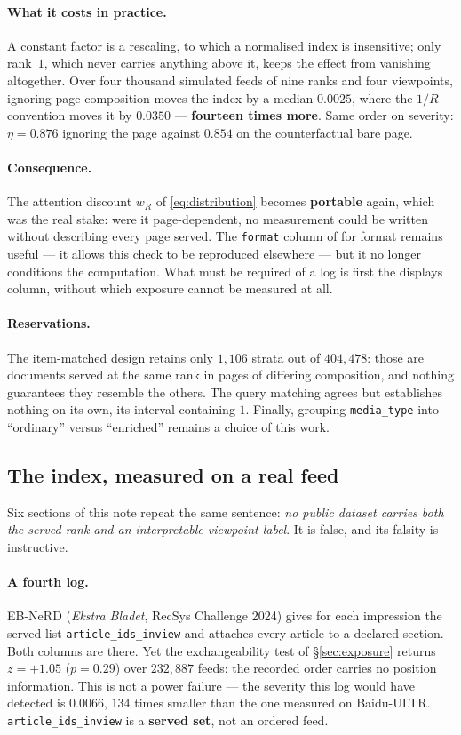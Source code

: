 \documentclass[11pt,a4paper]{article}
\begin{document}
\paragraph{What it costs in practice.} A constant factor is a rescaling, to which a normalised
index is insensitive; only rank~$1$, which never carries anything above it, keeps the effect from
vanishing altogether. Over four thousand simulated feeds of nine ranks and four viewpoints,
ignoring page composition moves the index by a median $0.0025$, where the $1/R$ convention moves
it by $0.0350$ --- \textbf{fourteen times more}. Same order on severity: $\eta = 0.876$ ignoring
the page against $0.854$ on the counterfactual bare page.

\paragraph{Consequence.} The attention discount $w_R$ of \eqref{eq:distribution} becomes
\textbf{portable} again, which was the real stake: were it page-dependent, no measurement
could be written without describing every page served. The \texttt{format} column of
for format remains useful --- it allows this check to be reproduced elsewhere --- but
it no longer conditions the computation. What must be required of a log is first the displays
column, without which exposure cannot be measured at all.

\paragraph{Reservations.} The item-matched design retains only $1{,}106$ strata out of
$404{,}478$: those are documents served at the same rank in pages of differing composition, and
nothing guarantees they resemble the others. The query matching agrees but establishes nothing on
its own, its interval containing $1$. Finally, grouping \texttt{media\_type} into ``ordinary''
versus ``enriched'' remains a choice of this work.

\subsection{The index, measured on a real feed}
\label{sec:indexmeasured}

Six sections of this note repeat the same sentence: \emph{no public dataset carries both the
served rank and an interpretable viewpoint label}. It is false, and its falsity is instructive.

\paragraph{A fourth log.} EB-NeRD (\emph{Ekstra Bladet}, RecSys Challenge 2024) gives for each
impression the served list \texttt{article\_ids\_inview} and attaches every article to a declared
section. Both columns are there. Yet the exchangeability test of \S\ref{sec:exposure} returns
$z = +1.05$ ($p = 0.29$) over $232{,}887$ feeds: the recorded order carries no position
information. This is not a power failure --- the severity this log would have detected is
$0.0066$, $134$ times smaller than the one measured on Baidu-ULTR.
\texttt{article\_ids\_inview} is a \textbf{served set}, not an ordered feed.
\end{document}
